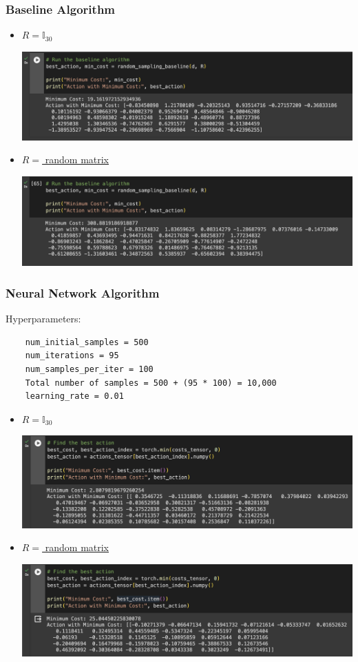 \documentclass{article}
\begin{document}
\subsubsection*{Baseline Algorithm}
\begin{itemize}
    \item \underline{$R = \mathbb{I}_{30}$}\par
    \includegraphics[scale=0.5]{BI.png}
    \item \underline{$R= $ random matrix}\par
    \includegraphics[scale=0.5]{BR.png}
\end{itemize}

\subsubsection*{Neural Network Algorithm}
Hyperparameters: 
\begin{verbatim}
    num_initial_samples = 500
    num_iterations = 95
    num_samples_per_iter = 100
    Total number of samples = 500 + (95 * 100) = 10,000
    learning_rate = 0.01
\end{verbatim}
\begin{itemize}
    \item \underline{$R = \mathbb{I}_{30}$}\par
    \includegraphics[scale = 0.5]{NI.png}
    \item \underline{$R= $ random matrix}\par
    \includegraphics[scale=0.5]{NR.png}
\end{itemize}
\end{document}

